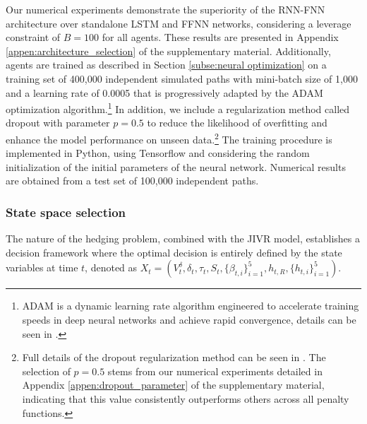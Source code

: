 \documentclass[12pt]{article}
\begin{document}
Our numerical experiments demonstrate the superiority of the RNN-FNN architecture over standalone LSTM and FFNN networks, considering a leverage constraint of $B=100$ for all agents. These results are presented in Appendix \ref{appen:architecture_selection} of the supplementary material. Additionally, agents are trained as described in Section \ref{subse:neural optimization} on a training set of 400,000 independent simulated paths with mini-batch size of 1,000 and a learning rate of 0.0005 that is progressively adapted by the ADAM optimization algorithm.\footnote{ADAM is a dynamic learning rate algorithm engineered to accelerate training speeds in deep neural networks and achieve rapid convergence, details can be seen in \cite{goodfellow2016deep}.} In addition, we include a regularization method called dropout with parameter $p=0.5$ to reduce the likelihood of overfitting and enhance the model performance on unseen data.\footnote{Full details of the dropout regularization method can be seen in \cite{goodfellow2016deep}. The selection of $p=0.5$ stems from our numerical experiments detailed in Appendix \ref{appen:dropout_parameter} of the supplementary material, indicating that this value consistently outperforms others across all penalty functions.} The training procedure is implemented in Python, using Tensorflow and considering the \cite{glorot2010understanding} random initialization of the initial parameters of the neural network. Numerical results are obtained from a test set of 100,000 independent paths. 

\subsubsection{State space selection}\label{subsub:state_space}

The nature of the hedging problem, combined with the JIVR model, establishes a decision framework where the optimal decision is entirely defined by the state variables at time $t$, denoted as $X_{t}=(V_{t}^{\delta},\delta_{t},\tau_{t},S_{t},\{\beta_{t,i} \}^5_{i=1}, h_{t,R}, \{ h_{t,i}\}^5_{i=1})$. 
\end{document}
